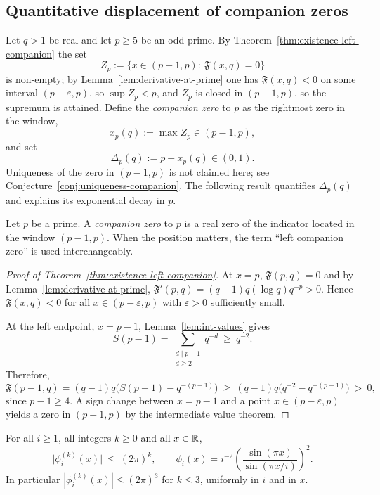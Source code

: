 \subsection{Quantitative displacement of companion zeros}\label{sec:companion-displacement}
Let $q>1$ be real and let $p\ge5$ be an odd prime. By Theorem~\ref{thm:existence-left-companion} the set
\[
Z_p:=\{x\in(p-1,p):\ \mathfrak F(x,q)=0\}
\]
is non-empty; by Lemma~\ref{lem:derivative-at-prime} one has $\mathfrak F(x,q)<0$ on some interval $(p-\varepsilon,p)$, so $\sup Z_p<p$, and $Z_p$ is closed in $(p-1,p)$, so the supremum is attained. Define the \emph{companion zero} to $p$ as the rightmost zero in the window,
\[
x_p(q):=\max Z_p\in(p-1,p),
\]
and set
\[
\Delta_p(q):=p-x_p(q)\in(0,1).
\]
Uniqueness of the zero in $(p-1,p)$ is not claimed here; see Conjecture~\ref{conj:uniqueness-companion}.
The following result quantifies $\Delta_p(q)$ and explains its exponential decay in $p$.

\begin{definition}\label{def:companion-zero}
Let $p$ be a prime. A \emph{companion zero} to $p$ is a real zero of the indicator located in the window $(p-1,p)$. When the position matters, the term “left companion zero” is used interchangeably.
\end{definition}

\begin{proof}[Proof of Theorem~\ref{thm:existence-left-companion}]
At $x=p$, $\mathfrak F(p,q)=0$ and by Lemma~\ref{lem:derivative-at-prime},
$\mathfrak F'(p,q)=(q-1)q(\log q)q^{-p}>0$. Hence $\mathfrak F(x,q)<0$ for all $x\in(p-\varepsilon,p)$ with $\varepsilon>0$ sufficiently small.

At the left endpoint, $x=p-1$, Lemma~\ref{lem:int-values} gives
\[
S(p-1)=\sum_{\substack{d\mid p-1\\ d\ge2}}q^{-d} \ \ge\ q^{-2}.
\]
Therefore,
\[
\mathfrak F(p-1,q)=(q-1)q\big(S(p-1)-q^{-(p-1)}\big)\ \ge\ (q-1)q\big(q^{-2}-q^{-(p-1)}\big)\ >\ 0,
\]
since $p-1\ge4$. A sign change between $x=p-1$ and a point $x\in(p-\varepsilon,p)$ yields a zero in $(p-1,p)$ by the intermediate value theorem.
\end{proof}

\begin{lemma}\label{lem:global-derivative-bound}
For all $i\ge1$, all integers $k\ge0$ and all $x\in\mathbb{R}$,
\[
\bigl|\phi_i^{(k)}(x)\bigr|\ \le\ (2\pi)^k ,
\qquad \phi_i(x)=i^{-2}\left(\frac{\sin(\pi x)}{\sin(\pi x/i)}\right)^2 .
\]
In particular $|\phi_i^{(k)}(x)|\le(2\pi)^3$ for $k\le3$, uniformly in $i$ and in $x$.
\end{lemma}

